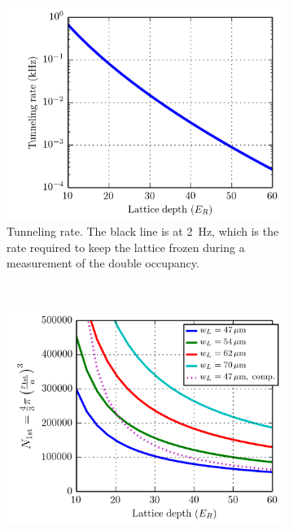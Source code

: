 \documentclass[11pt,letter]{article}
\begin{document}
\begin{figure}
        \centering
        \begin{subfigure}[t]{0.48\textwidth}
		\includegraphics[width=\textwidth]{figures/lattice_tunneling.png}
\caption{Tunneling rate.  The black line is at 2~Hz, which is the rate required
to keep the lattice frozen during a measurement of the double occupancy.}
                \label{fig:lattice_lockA}
        \end{subfigure}
        ~ %
        \begin{subfigure}[t]{0.48\textwidth}
		\includegraphics[width=\textwidth]{figures/lattice_lock.png}

\end{subfigure}
\end{figure}
\end{document}
